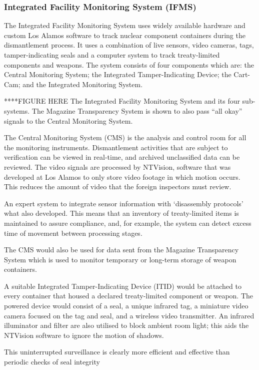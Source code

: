 \documentclass[twoside,titlepage,11pt,twocolumn,a4paper]{article}
\begin{document}
\subsubsection{Integrated Facility Monitoring System (IFMS)}
The Integrated Facility Monitoring System uses widely available 
hardware and custom Los Alamos software to track nuclear component 
containers during the dismantlement process. It uses a combination 
of live sensors, video cameras, tags, tamper-indicating seals and 
a computer system to track treaty-limited components and weapons. 
The system consists of four components which are: the Central 
Monitoring System; the Integrated Tamper-Indicating Device; 
the Cart-Cam; and the Integrated Monitoring System. 

****FIGURE HERE The Integrated Facility Monitoring System and 
its four sub-systems. The Magazine Transparency System is shown 
to also pass ``all okay'' signals to the Central Monitoring System. 
\citep{gerdes2001}

The Central Monitoring System (CMS) is the analysis and control 
room for all the monitoring instruments. Dismantlement activities 
that are subject to verification can be viewed in real-time, and 
archived unclassified data can be reviewed. The video signals are 
processed by NTVision, software that was developed at Los Alamos 
to only store video footage in which motion occurs. This reduces 
the amount of video that the foreign inspectors must review.

An expert system to integrate sensor information with `disassembly 
protocols' what also developed. This means that an inventory of 
treaty-limited items is maintained to assure compliance, and, for 
example, the system can detect excess time of movement between 
processing stages.

The CMS would also be used for data sent from the Magazine 
Transparency System which is used to monitor temporary or 
long-term storage of weapon containers.

A suitable Integrated Tamper-Indicating Device (ITID) would be 
attached to every container that housed a declared treaty-limited 
component or weapon. The powered device would consist of a seal, 
a unique infrared tag, a miniature video camera focused on the tag 
and seal, and a wireless video transmitter. An infrared illuminator 
and filter are also utilised to block ambient room light; this aids 
the NTVision software to ignore the motion of shadows.

This uninterrupted surveillance is clearly more efficient and 
effective than periodic checks of seal integrity
\end{document}
